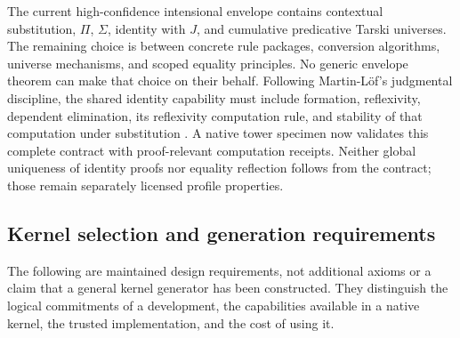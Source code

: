 \documentclass[11pt]{article}
\theoremstyle{definition}
\theoremstyle{remark}
\begin{document}
The current high-confidence intensional envelope contains contextual
substitution, $\Pi$, $\Sigma$, identity with $J$, and cumulative predicative
Tarski universes.  The remaining choice is between concrete rule packages,
conversion algorithms, universe mechanisms, and scoped equality principles.
No generic envelope theorem can make that choice on their behalf.  Following
Martin-L\"of's judgmental discipline, the shared identity capability must include
formation, reflexivity, dependent elimination, its reflexivity computation rule,
and stability of that computation under substitution \cite{MartinLofITT}.  A
native tower specimen now validates this complete contract with proof-relevant
computation receipts.  Neither global uniqueness of identity proofs nor equality
reflection follows from the contract; those remain separately licensed profile
properties.

\subsection{Kernel selection and generation requirements}
\label{sec:kernel-generation-requirements}

The following are maintained design requirements, not additional axioms or a
claim that a general kernel generator has been constructed. They distinguish
the logical commitments of a development, the capabilities available in a
native kernel, the trusted implementation, and the cost of using it.
\end{document}
